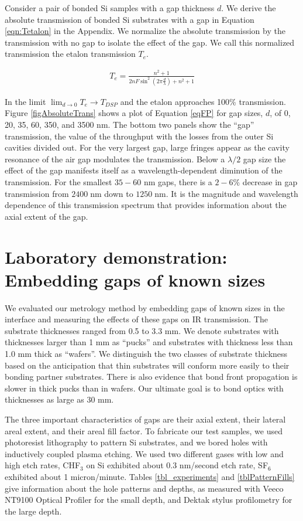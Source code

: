 \documentclass[osajnl,preprint,showpacs,superscriptaddress,12pt]{revtex4-1} %
\begin{document}
Consider a pair of bonded Si samples with a gap thickness $d$. We derive the absolute transmission of bonded Si substrates with a gap in Equation \ref{eqn:Tetalon} in the Appendix.  We normalize the absolute transmission by the transmission with no gap to isolate the effect of the gap.  We call this normalized transmission the etalon transmission $T_{e}$.

\begin{eqnarray}
T_{e} = \frac{n^2+1}{2 n F \sin ^2(2\pi \frac{d}{\lambda})+n^2+1} \label{eqFP}
\end{eqnarray}

In the limit $\lim_{d \to 0} T_e \rightarrow T_{DSP} $ and the etalon approaches 100\% transmission.  Figure \ref{figAbsoluteTrans} shows a plot of Equation \ref{eqFP} for gap sizes, $d$, of 0, 20, 35, 60, 350, and 3500 nm.  The bottom two panels show the ``gap'' transmission, the value of the throughput with the losses from the outer Si cavities divided out.  For the very largest gap, large fringes appear as the cavity resonance of the air gap modulates the transmission.  Below a $\lambda/2$ gap size the effect of the gap manifests itself as a wavelength-dependent diminution of the transmission.  For the smallest $35-60$ nm gaps, there is a $2-6\%$ decrease in gap transmission from $2400\;$nm down to $1250\;$nm.  It is the magnitude and wavelength dependence of this transmission spectrum that provides information about the axial extent of the gap.

\section{Laboratory demonstration: Embedding gaps of known sizes}

We evaluated our metrology method by embedding gaps of known sizes in the interface and measuring the effects of these gaps on IR transmission.  The substrate thicknesses ranged from 0.5 to 3.3 mm.  We denote substrates with thicknesses larger than 1 mm as ``pucks'' and substrates with thickness less than 1.0 mm thick as ``wafers''.  We distinguish the two classes of substrate thickness based on the anticipation that thin substrates will conform more easily to their bonding partner substrates.  There is also evidence that bond front propagation is slower in thick pucks \cite{2007ApOpt..46.6793H} than in wafers.  Our ultimate goal is to bond optics with thicknesses as large as 30 mm.

The three important characteristics of gaps are their axial extent, their lateral areal extent, and their areal fill factor.  To fabricate our test samples, we used photoresist lithography to pattern Si substrates, and we bored holes with inductively coupled plasma etching.  We used two different gases with low and high etch rates, CHF$_3$ on Si exhibited about 0.3 nm/second etch rate, SF$_6$ exhibited about 1 micron/minute.  Tables \ref{tbl_experiments} and \ref{tblPatternFills} give information about the hole patterns and depths, as measured with Veeco NT9100 Optical Profiler for the small depth, and Dektak stylus profilometry for the large depth.
\end{document}
